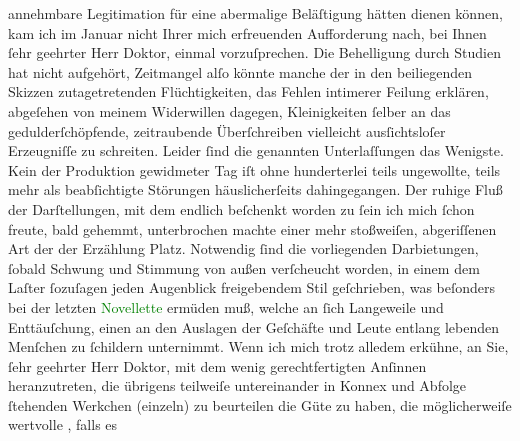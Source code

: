                     annehmbare Legitimation für eine abermalige Beläſtigung hätten dienen können,
                    kam ich im Januar nicht Ihrer mich erfreuenden Aufforderung nach,
                    bei Ihnen ſehr geehrter Herr Doktor, einmal vorzuſprechen. Die Behelligung durch
                    Studien hat nicht aufgehört, Zeitmangel alſo könnte manche der in den
                    beiliegenden Skizzen zutagetretenden Flüchtigkeiten, das Fehlen intimerer
                    Feilung erklären, {\pb}abgeſehen von
                    meinem Widerwillen dagegen, Kleinigkeiten ſelber an das gedulderſchöpfende,
                    zeitraubende Überſchreiben vielleicht ausſichtsloſer Erzeugniſſe zu schreiten.
                    Leider ſind die genannten Unterlaſſungen das Wenigste. Kein der Produktion
                    gewidmeter Tag iſt ohne hunderterlei teils ungewollte, teils mehr als
                    beabſichtigte Störungen häuslicherſeits dahingegangen. Der ruhige Fluß der
                    Darſtellungen, mit dem endlich beſchenkt worden zu ſein ich mich ſchon freute,
                    bald gehemmt, unterbrochen machte einer mehr stoßweiſen, abgeriſſenen Art der
                    der Erzählung Platz. Notwendig ſind die vorliegenden Darbietungen,
                    ſobald Schwung {\pb}und Stimmung von
                    außen verſcheucht worden, in einem dem Laſter ſozuſagen jeden Augenblick
                    freigebendem Stil geſchrieben, was beſonders bei der letzten \textcolor{green}{Novellette}{} ermüden muß, welche an ſich
                    Langeweile und Enttäuſchung, einen an den Auslagen der Geſchäfte und Leute
                    entlang lebenden Menſchen zu ſchildern unternimmt. Wenn ich mich trotz alledem
                    erkühne, an Sie, ſehr geehrter Herr Doktor, mit dem wenig gerechtfertigten
                    Anſinnen heranzutreten, die übrigens teilweiſe untereinander in Konnex und
                    Abfolge ſtehenden Werkchen (einzeln) zu beurteilen die Güte zu haben, {\pb}die möglicherweiſe wertvolle \label{K_L01792_2v}\label{K_L01792_2h}, falls es
